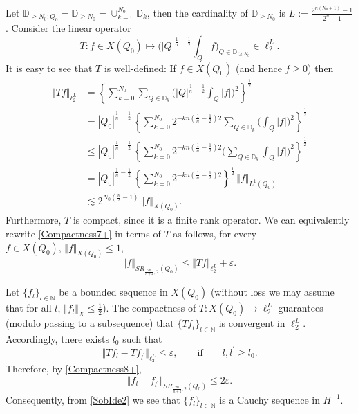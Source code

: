 \documentclass[11pt, a4paper,leqno]{amsart}
\theoremstyle{plain}
\numberwithin{equation}{section}
\theoremstyle{definition}
\theoremstyle{remark}
\begin{document}
Let $\mathbb{D}_{\geq N_{0};Q_{0}} = \mathbb{D}_{\geq N_0 }=\cup_{k=0}^{N_{0}}\mathbb{D}_{k}$, then
the cardinality of $\mathbb{D}_{\geq N_{0}}$ is $L:=\frac{2^{n(N_{0}+1)}%
-1}{2^{n}-1}$. Consider the linear operator
\[
T:f\in X(Q_{0})\mapsto\bigg(|Q|^{\frac{1}{n}-\frac{1}{2}}\int_{Q}%
f\bigg)_{Q\in\mathbb{D}_{\geq N_{0}}}\in\ell_{2}^{L}.
\]
It is easy to see that $T$ is well-defined: If $f\in X(Q_0)$ (and hence $f \geq 0$) then
\begin{align*}
\Vert Tf\Vert_{\ell_{2}^{L}} &  = \left\{  \sum_{k=0}^{N_{0}}\sum
_{Q\in\mathbb{D}_{k}}\bigg(|Q|^{\frac{1}{n}-\frac{1}{2}}\int%
_{Q}|f|\bigg)^{2}\right\}  ^{\frac{1}{2}}\\
&  =|Q_{0}|^{\frac{1}{n}-\frac{1}{2}}\,\left\{  \sum_{k=0}^{N_{0}}%
2^{-kn(\frac{1}{n}-\frac{1}{2})2}\sum_{Q\in\mathbb{D}_{k}}\bigg(\int%
_{Q}|f|\bigg)^{2}\right\}  ^{\frac{1}{2}}\\
&  \leq|Q_{0}|^{\frac{1}{n}-\frac{1}{2}}\,\left\{  \sum_{k=0}^{N_{0}%
}2^{-kn(\frac{1}{n}-\frac{1}{2})2}\bigg(\sum_{Q\in\mathbb{D}_{k}}%
\int_{Q}|f|\bigg)^{2}\right\}  ^{\frac{1}{2}}\\
&  =|Q_{0}|^{\frac{1}{n}-\frac{1}{2}}\,\left\{  \sum_{k=0}^{N_{0}}%
2^{-kn(\frac{1}{n}-\frac{1}{2})2}\right\}  ^{\frac{1}{2}}\,\Vert f\Vert_{L^{1}(Q_{0})}\\
&  \lesssim2^{N_{0}(\frac{n}{2}-1)}\,\Vert f\Vert_{X(Q_{0})}.
\end{align*}
Furthermore, $T$ is compact, since it is a finite rank operator. We can
equivalently rewrite \eqref{Compactness7+} in terms of $T$ as follows, for
every $f\in X(Q_{0}),\,\Vert f\Vert_{X(Q_{0})}\leq1$,
\begin{equation}
\Vert f\Vert_{SR_{\frac{2n}{n+2},2}(Q_{0})}\leq\Vert Tf\Vert_{\ell_{2}^{L}%
}+\varepsilon.\label{Compactness8+}%
\end{equation}


Let $\{f_{l}\}_{l\in \mathbb{N}}$ be a bounded sequence in $X(Q_{0})$ (without loss we
may assume that for all $l$, $\Vert f_{l}\Vert_{X}\leq\frac{1}{2}$). The
compactness of $T:X(Q_{0})\rightarrow\ell_{2}^{L}$ guarantees (modulo passing
to a subsequence) that $\{Tf_{l}\}_{l \in \mathbb{N}}$ is convergent in $\ell_{2}^{L}$.
Accordingly, there exists $l_{0}$ such that
\[
\Vert Tf_{l}-Tf_{l^{\prime}}\Vert_{\ell_{2}^{L}}\leq\varepsilon,\qquad
\text{if}\qquad l,l^{\prime}\geq l_{0}.
\]
Therefore, by \eqref{Compactness8+},
\[
\Vert f_{l}-f_{l^{\prime}}\Vert_{SR_{\frac{2n}{n+2},2}(Q_{0})}\leq
2\varepsilon.
\]
Consequently, from \eqref{SobIde2} we
see that $\{f_{l}\}_{l \in \mathbb{N}}$ is a Cauchy sequence in $H^{-1}$. 
\end{document}
